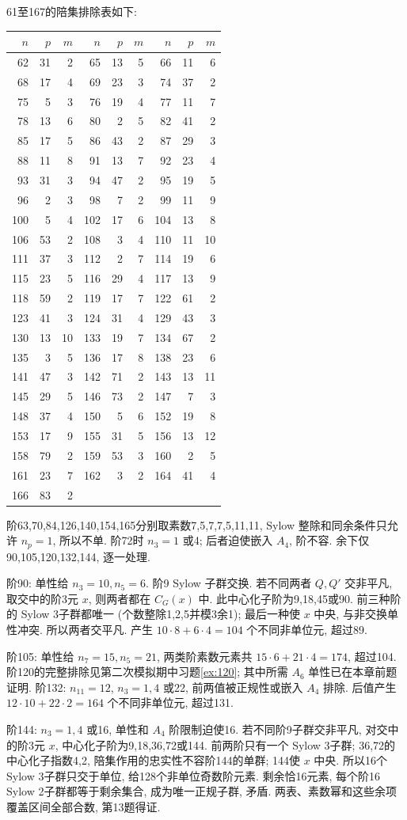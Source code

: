\begin{solution}
61至167的陪集排除表如下:
\begin{longtable}{@{}rrr@{\qquad}rrr@{\qquad}rrr@{}}
\toprule $n$&$p$&$m$&$n$&$p$&$m$&$n$&$p$&$m$\\\midrule\endhead
62&31&2&65&13&5&66&11&6\\
68&17&4&69&23&3&74&37&2\\
75&5&3&76&19&4&77&11&7\\
78&13&6&80&2&5&82&41&2\\
85&17&5&86&43&2&87&29&3\\
88&11&8&91&13&7&92&23&4\\
93&31&3&94&47&2&95&19&5\\
96&2&3&98&7&2&99&11&9\\
100&5&4&102&17&6&104&13&8\\
106&53&2&108&3&4&110&11&10\\
111&37&3&112&2&7&114&19&6\\
115&23&5&116&29&4&117&13&9\\
118&59&2&119&17&7&122&61&2\\
123&41&3&124&31&4&129&43&3\\
130&13&10&133&19&7&134&67&2\\
135&3&5&136&17&8&138&23&6\\
141&47&3&142&71&2&143&13&11\\
145&29&5&146&73&2&147&7&3\\
148&37&4&150&5&6&152&19&8\\
153&17&9&155&31&5&156&13&12\\
158&79&2&159&53&3&160&2&5\\
161&23&7&162&3&2&164&41&4\\
166&83&2&&&&&&\\
\bottomrule
\end{longtable}
阶63,70,84,126,140,154,165分别取素数7,5,7,7,5,11,11, Sylow 整除和同余条件只允许 $n_p=1$, 所以不单. 阶72时 $n_3=1$ 或4; 后者迫使嵌入 $A_4$, 阶不容. 余下仅90,105,120,132,144, 逐一处理.

阶90: 单性给 $n_3=10,n_5=6$. 阶9 Sylow 子群交换. 若不同两者 $Q,Q'$ 交非平凡, 取交中的阶3元 $x$, 则两者都在 $C_G(x)$ 中. 此中心化子阶为9,18,45或90. 前三种阶的 Sylow 3子群都唯一 (个数整除1,2,5并模3余1); 最后一种使 $x$ 中央, 与非交换单性冲突. 所以两者交平凡. 产生 $10\cdot8+6\cdot4=104$ 个不同非单位元, 超过89.

阶105: 单性给 $n_7=15,n_5=21$, 两类阶素数元素共 $15\cdot6+21\cdot4=174$, 超过104. 阶120的完整排除见第二次模拟期中习题\ref{ex:120}; 其中所需 $A_6$ 单性已在本章前题证明. 阶132: $n_{11}=12$, $n_3=1,4$ 或22, 前两值被正规性或嵌入 $A_4$ 排除. 后值产生 $12\cdot10+22\cdot2=164$ 个不同非单位元, 超过131.

阶144: $n_3=1,4$ 或16, 单性和 $A_4$ 阶限制迫使16. 若不同阶9子群交非平凡, 对交中的阶3元 $x$, 中心化子阶为9,18,36,72或144. 前两阶只有一个 Sylow 3子群; 36,72的中心化子指数4,2, 陪集作用的忠实性不容阶144的单群; 144使 $x$ 中央. 所以16个 Sylow 3子群只交于单位, 给128个非单位奇数阶元素. 剩余恰16元素, 每个阶16 Sylow 2子群都等于剩余集合, 成为唯一正规子群, 矛盾. 两表、素数幂和这些余项覆盖区间全部合数, 第13题得证.
\end{solution}

